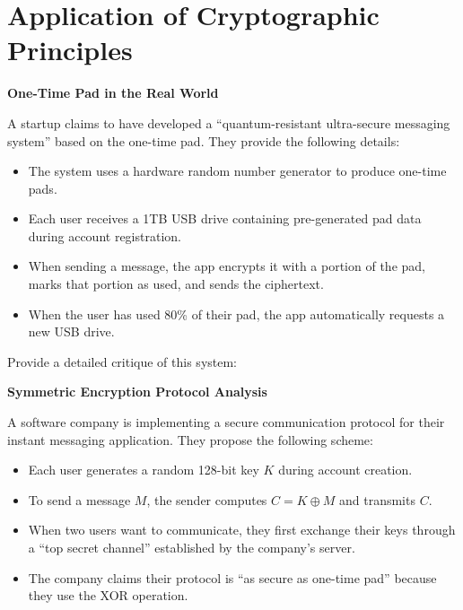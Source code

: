 \documentclass[10pt,a4paper,american]{exam}
\begin{document}
\section{Application of Cryptographic Principles}
\begin{questions}
	\question[15] \textbf{One-Time Pad in the Real World}

	A startup claims to have developed a ``quantum-resistant ultra-secure messaging system'' based on the one-time pad. They provide the following details:

	\begin{itemize}
		\item The system uses a hardware random number generator to produce one-time pads.
		\item Each user receives a 1TB USB drive containing pre-generated pad data during account registration.
		\item When sending a message, the app encrypts it with a portion of the pad, marks that portion as used, and sends the ciphertext.
		\item When the user has used 80\% of their pad, the app automatically requests a new USB drive.
	\end{itemize}

	Provide a detailed critique of this system:

	\question[15] \textbf{Symmetric Encryption Protocol Analysis}

	A software company is implementing a secure communication protocol for their instant messaging application. They propose the following scheme:

	\begin{itemize}
		\item Each user generates a random 128-bit key $K$ during account creation.
		\item To send a message $M$, the sender computes $C = K \oplus M$ and transmits $C$.
		\item When two users want to communicate, they first exchange their keys through a ``top secret channel'' established by the company's server.
		\item The company claims their protocol is ``as secure as one-time pad'' because they use the XOR operation.
	\end{itemize}


\end{questions}
\end{document}
